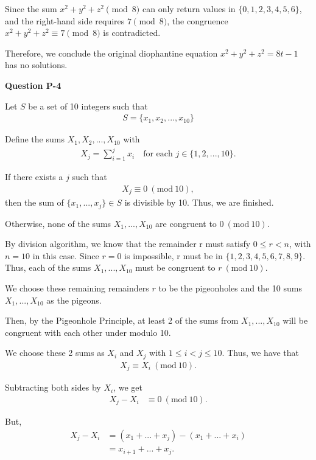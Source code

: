 \documentclass[12pt]{article}
\newcommand{\Mod}[1]{\ (\mathrm{mod}\ #1)}
\begin{document}
Since the sum $x^2 + y^2 + z^2 \pmod 8$ can only return values in $\{0, 1, 2, 3, 4, 5, 6\}$, and the right-hand side requires $7 \pmod 8$, the congruence $x^2 + y^2 + z^2 \equiv 7 \pmod 8$ is contradicted.

Therefore, we conclude the original diophantine equation $x^2+y^2+z^2 = 8t -1$ has no solutions.


\noindent \textbf{Question P-4}

Let $S$ be a set of 10 integers such that
\begin{align*}
    S = \{x_1, x_2, ... , x_{10}\}
\end{align*}

Define the sums $X_1, X_2, ... , X_{10}$ with
\begin{align*}
    {X_j} = \sum_{i=1}^{j}x_i ~~~ \text{ for each } j \in{\{1, 2, ... ,10\}}.
\end{align*}

If there exists a $j$ such that
\begin{align*}
    X_j \equiv{} 0\Mod{10},
\end{align*}
then the sum of $\{x_1, ... ,x_j\} \in{S}$ is divisible by 10. Thus, we are finished.

Otherwise, none of the sums $X_1, ... , X_{10}$ are congruent to $0 \Mod{10}$.

By division algorithm, we know that the remainder r must satisfy $0 \leq{} r < n$, with $n=10$ in this case.
Since $r=0$ is impossible, r must be in $\{1, 2, 3, 4, 5, 6, 7, 8 ,9\}$.
Thus, each of the sums $X_1, ... ,X_{10}$ must be congruent to $r \Mod{10}$.

We choose these remaining remainders $r$ to be the pigeonholes and the 10 sums $X_1, ... ,X_{10}$ as the pigeons.

Then, by the Pigeonhole Principle, at least 2 of the sums from $X_1, ... , X_{10}$ will be congruent with each other under modulo 10.

We choose these 2 sums as $X_i$ and $X_j$ with $1 \leq i < j \leq 10$.
Thus, we have that
\begin{align*}
    X_j \equiv{} X_i \Mod{10}.
\end{align*}

Subtracting both sides by $X_i$, we get
\begin{align*}
    X_j - X_i & \equiv 0\Mod{10}.
\end{align*}

But,
\begin{align*}
    X_j - X_i & = (x_1 + ... + x_j) - (x_1 + ... + x_i) \\
              & = x_{i+1} + ... + x_j.
\end{align*}
\end{document}
